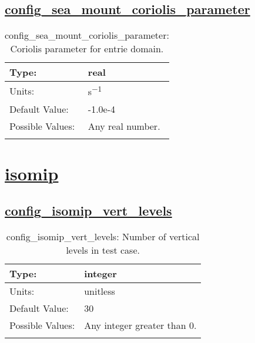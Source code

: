 \subsection[config\_sea\_mount\_coriolis\_parameter]{\hyperref[sec:nm_tab_sea_mount]{config\_sea\_mount\_coriolis\_parameter}}
\label{subsec:nm_sec_config_sea_mount_coriolis_parameter}
\begin{center}
\begin{longtable}{| p{2.0in} || p{4.0in} |}
    \hline
    Type: & real \\
    \hline
    Units: & \si{s^{-1}} \\
    \hline
    Default Value: & -1.0e-4 \\
    \hline
    Possible Values: & Any real number. \\
    \hline
    \caption{config\_sea\_mount\_coriolis\_parameter: Coriolis parameter for entrie domain.}
\end{longtable}
\end{center}
\section[isomip]{\hyperref[sec:nm_tab_isomip]{isomip}}
\label{sec:nm_sec_isomip}
\subsection[config\_isomip\_vert\_levels]{\hyperref[sec:nm_tab_isomip]{config\_isomip\_vert\_levels}}
\label{subsec:nm_sec_config_isomip_vert_levels}
\begin{center}
\begin{longtable}{| p{2.0in} || p{4.0in} |}
    \hline
    Type: & integer \\
    \hline
    Units: & \si{unitless} \\
    \hline
    Default Value: & 30 \\
    \hline
    Possible Values: & Any integer greater than 0. \\
    \hline
    \caption{config\_isomip\_vert\_levels: Number of vertical levels in test case.}
\end{longtable}
\end{center}
